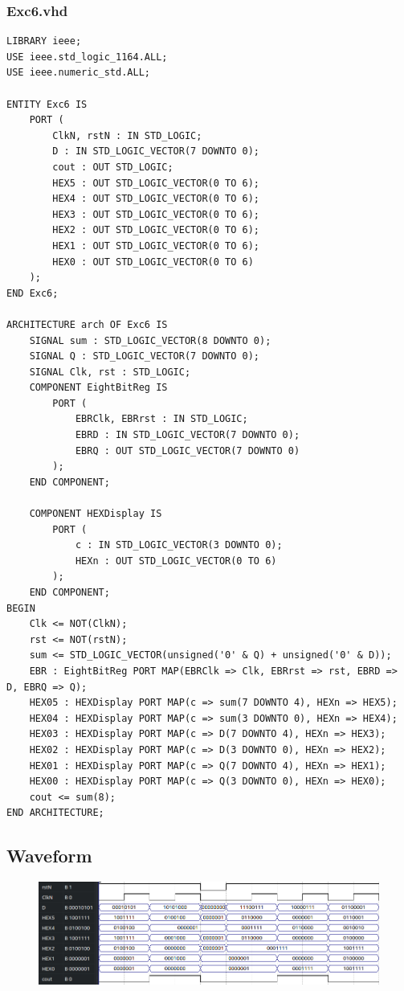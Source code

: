 \documentclass[13pt,a4paper]{report}
\begin{document}
\subsubsection{Exc6.vhd}
\begin{verbatim}
LIBRARY ieee;
USE ieee.std_logic_1164.ALL;
USE ieee.numeric_std.ALL;

ENTITY Exc6 IS
	PORT (
		ClkN, rstN : IN STD_LOGIC;
		D : IN STD_LOGIC_VECTOR(7 DOWNTO 0);
		cout : OUT STD_LOGIC;
		HEX5 : OUT STD_LOGIC_VECTOR(0 TO 6);
		HEX4 : OUT STD_LOGIC_VECTOR(0 TO 6);
		HEX3 : OUT STD_LOGIC_VECTOR(0 TO 6);
		HEX2 : OUT STD_LOGIC_VECTOR(0 TO 6);
		HEX1 : OUT STD_LOGIC_VECTOR(0 TO 6);
		HEX0 : OUT STD_LOGIC_VECTOR(0 TO 6)
	);
END Exc6;

ARCHITECTURE arch OF Exc6 IS
	SIGNAL sum : STD_LOGIC_VECTOR(8 DOWNTO 0);
	SIGNAL Q : STD_LOGIC_VECTOR(7 DOWNTO 0);
	SIGNAL Clk, rst : STD_LOGIC;
	COMPONENT EightBitReg IS
		PORT (
			EBRClk, EBRrst : IN STD_LOGIC;
			EBRD : IN STD_LOGIC_VECTOR(7 DOWNTO 0);
			EBRQ : OUT STD_LOGIC_VECTOR(7 DOWNTO 0)
		);
	END COMPONENT;

	COMPONENT HEXDisplay IS
		PORT (
			c : IN STD_LOGIC_VECTOR(3 DOWNTO 0);
			HEXn : OUT STD_LOGIC_VECTOR(0 TO 6)
		);
	END COMPONENT;
BEGIN
	Clk <= NOT(ClkN);
	rst <= NOT(rstN);
	sum <= STD_LOGIC_VECTOR(unsigned('0' & Q) + unsigned('0' & D));
	EBR : EightBitReg PORT MAP(EBRClk => Clk, EBRrst => rst, EBRD => D, EBRQ => Q);
	HEX05 : HEXDisplay PORT MAP(c => sum(7 DOWNTO 4), HEXn => HEX5);
	HEX04 : HEXDisplay PORT MAP(c => sum(3 DOWNTO 0), HEXn => HEX4);
	HEX03 : HEXDisplay PORT MAP(c => D(7 DOWNTO 4), HEXn => HEX3);
	HEX02 : HEXDisplay PORT MAP(c => D(3 DOWNTO 0), HEXn => HEX2);
	HEX01 : HEXDisplay PORT MAP(c => Q(7 DOWNTO 4), HEXn => HEX1);
	HEX00 : HEXDisplay PORT MAP(c => Q(3 DOWNTO 0), HEXn => HEX0);
	cout <= sum(8);
END ARCHITECTURE;
\end{verbatim}

\subsection{Waveform}
\begin{figure}[H]
\centering
\includegraphics[scale=0.65]{images/Exc6_waveform.png}
\end{figure}
\end{document}

